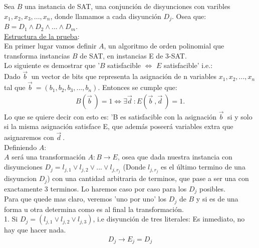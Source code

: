 \documentclass{article}
\begin{document}
Sea $B$ una instancia de SAT, una conjunción de disyunciones con varibles $x_1,x_2,x_3,...,x_n$, 
donde llamamos a cada disyunción $D_j$. Osea que: $B = D_1 \wedge D_2 \wedge ... \wedge D_m$.\\

\underline{{\large Estructura de la prueba}}:\\
En primer lugar vamos definir $A$, un algoritmo de orden polinomial que transforma instancias $B$ 
de SAT, en instancias E de 3-SAT.\\
Lo siguiente es demostrar que '$B$ satisfacible $\iff$ $E$ satisfacible' i.e.:\\
Dado $\vec{b}^{\ }$ un vector de bits que representa la asignación de n variables $x_1,x_2,...,x_n$ 
tal que $\vec{b}^{\ } = (b_1,b_2,b_3,...,b_n)$. Entonces se cumple que:
\begin{equation}
	\begin{aligned}
		B(\vec{b}^{\ }) = 1 \iff \exists \vec{d}^{\ } : E(\vec{b}^{\ }, \vec{d}^{\ }) = 1.
	\end{aligned}
\end{equation}
Lo que se quiere decir con esto es: 'B es satisfacible con la asignación $\vec{b}^{\ }$ si y solo
si la misma asignación satisface E, que además poseerá variables extra que asignaremos con
$\vec{d}^{\ }$.
\\


{\large Definiendo $A$}:\\

$A$ será una transformación $A:B\to E$, osea que dada nuestra instancia con disyunciones $D_j = 
l_{j,1} \lor l_{j,2} \lor ... \lor l_{j,r_{j}}$ (Donde $l_{j,r_j}$ es el último termino
de una disyuncion $D_j$)
con una cantidad arbitraria de terminos, que pase a ser una con exactamente 3 terminos. Lo haremos
caso por caso para los  $D_j$ posibles.\\

Para que quede mas claro, veremos 'uno por uno' los $D_j$ de $B$ y si es de una forma u otra 
determina como es al final la transformación.\\

1. Si $D_j = (l_{j,1} \lor l_{j,2} \lor l_{j,3})$, i.e disyunción de tres literales:
	Es inmediato, no hay que hacer nada.\\
	\begin{equation}
		\begin{aligned}
			D_j \to E_j = D_j
		\end{aligned}
	\end{equation}
\end{document}
